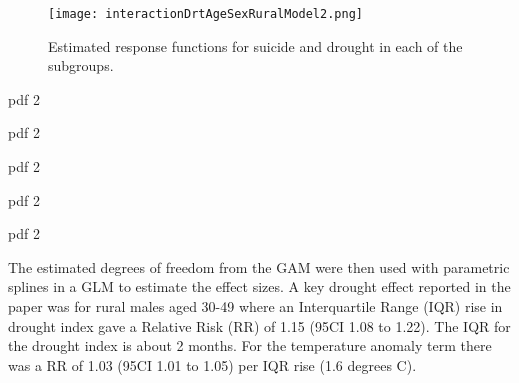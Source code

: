 \documentclass[a4paper]{article}                %
\begin{document}


        \begin{figure}[!h]
        \centering
        \texttt{[image: interactionDrtAgeSexRuralModel2.png]}
        \caption{Estimated response functions for suicide and drought in each of the subgroups.}
        \label{fig:interactionDrtAgeSexRuralModel2.png}
        \end{figure}


\begin{Schunk}
\begin{Soutput}
pdf 
  2 
\end{Soutput}
\begin{Soutput}
pdf 
  2 
\end{Soutput}
\begin{Soutput}
pdf 
  2 
\end{Soutput}
\end{Schunk}


\begin{Schunk}
\begin{Soutput}
pdf 
  2 
\end{Soutput}
\begin{Soutput}
pdf 
  2 
\end{Soutput}
\end{Schunk}



        The estimated degrees of freedom from the GAM were then used with parametric splines in a GLM to estimate the effect sizes.  A key drought effect reported in the paper was for rural males aged 30-49 where an Interquartile Range (IQR) rise in drought index gave a Relative Risk (RR) of 1.15 (95CI 1.08 to 1.22).  The IQR for the drought index is about 2 months.
        For the temperature anomaly term there was a RR of 1.03 (95CI 1.01 to 1.05) per IQR rise (1.6 degrees C).
\end{document}
